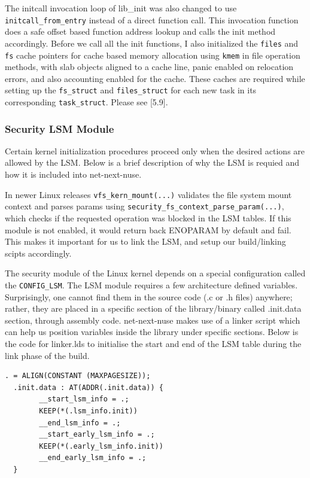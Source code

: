 \documentclass{sig-alternate}
\begin{document}
The initcall invocation loop of lib\_init was also changed to use \texttt{initcall\_from\_entry} instead of a direct function call. 
This invocation function does a safe offset based function address lookup and calls the init method accordingly. 
Before we call all the init functions, I also initialized the \texttt{files} and \texttt{fs} cache pointers for cache based memory 
allocation using \texttt{kmem} in file operation methods, with slab objects aligned to a cache line, panic enabled on relocation errors, and also accounting enabled 
for the cache. These caches are required while setting up the \texttt{fs\_struct} and \texttt{files\_struct} for each new task in its 
corresponding \texttt{task\_struct}. Please see [5.9].

\subsubsection{Security LSM Module}\label{Section_LSM}
Certain kernel initialization procedures proceed only when the desired actions are allowed by the LSM. Below is a brief description of why the LSM is requied and how 
it is included into net-next-nuse.

In newer Linux releases \texttt{vfs\_kern\_mount(...)} validates the file system mount context and parses params using \texttt{security\_fs\_context\_parse\_param(...)},
which checks if the requested operation was blocked in the LSM tables. If this module is not enabled, it would return back ENOPARAM by default and fail. This makes it 
important for us to link the LSM, and setup our build/linking scipts accordingly.

The security module of the Linux kernel depends on a special configuration called the \texttt{CONFIG\_LSM}. The LSM module requires a few architecture
defined variables. Surprisingly, one cannot find them in the source code (.c or .h files) anywhere; rather, they are placed in a specific section
of the library/binary called .init.data section, through assembly code. net-next-nuse makes use of a linker script which can help us position variables inside
the library under specific sections. Below is the code for linker.lds to initialise the start and end of the LSM table during the link phase of the build.
\begin{lstlisting}[style=CStyle]
  . = ALIGN(CONSTANT (MAXPAGESIZE));
  .init.data : AT(ADDR(.init.data)) {    
		__start_lsm_info = .;	
		KEEP(*(.lsm_info.init))
		__end_lsm_info = .;    
		__start_early_lsm_info = .;	
		KEEP(*(.early_lsm_info.init))
		__end_early_lsm_info = .;
  }
\end{lstlisting}
\end{document}

